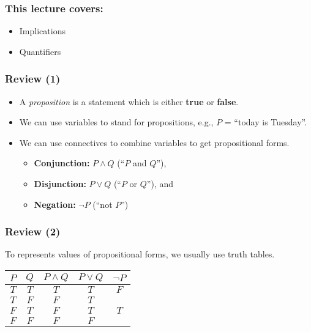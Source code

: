 

\begin{frame}\frametitle{This lecture covers:}
  \begin{itemize}
  \item Implications
  \item Quantifiers
  \end{itemize}
\end{frame}

\begin{frame}\frametitle{Review (1)}
  \begin{itemize}
  \item A {\em proposition} is a statement which is either {\bf true}
    or {\bf false}.
  \item We can use variables to stand for propositions, e.g., $P$ =
    ``today is Tuesday''.
  \item We can use connectives to combine variables to get
    propositional forms.
    \begin{itemize}
    \item {\bf Conjunction:} $P\wedge Q$ (``$P$ and $Q$''), 
    \item {\bf Disjunction:} $P\vee Q$ (``$P$ or $Q$''), and
    \item {\bf Negation:} $\neg P$ (``not $P$'') 
    \end{itemize}
  \end{itemize}
\end{frame}

\begin{frame}\frametitle{Review (2)}
  To represents values of propositional forms, we usually use truth tables.
  \begin{tcolorbox}[title=And/Or/Not]
    \begin{tabular}{|c|c||c|c|c|}
      \hline
      $P$ & $Q$ & $P\wedge Q$ & $P\vee Q$ & $\neg P$ \\
      \hline
      $T$ & $T$ & $T$ & $T$ & $F$ \\
      $T$ & $F$ & $F$ & $T$ & \\
      $F$ & $T$ & $F$ & $T$ & $T$ \\
      $F$ & $F$ & $F$ & $F$ & \\
      \hline
    \end{tabular}
  \end{tcolorbox}
\end{frame}

